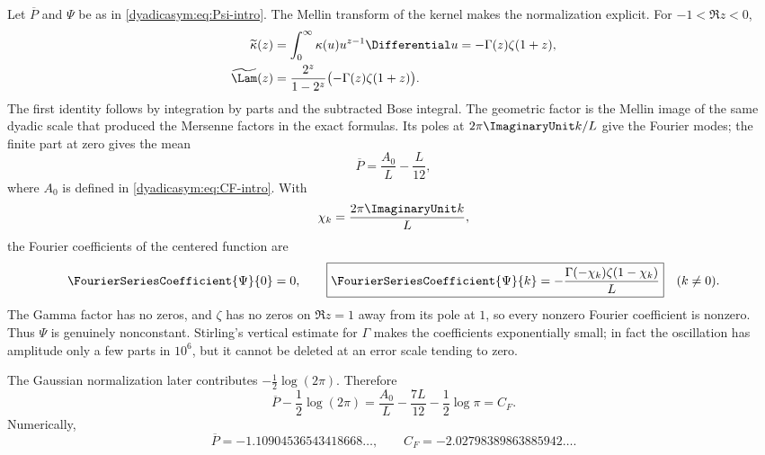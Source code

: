 \documentclass[11pt,oneside]{article}
\theoremstyle{definition}
\theoremstyle{remark}
\begin{document}
Let $\overline P$ and $\Psi$ be as in \eqref{dyadicasym:eq:Psi-intro}.  The Mellin transform of the
kernel makes the normalization explicit.  For $-1<\Re z<0$,
\begin{align}
 \widetilde\kappa(z)
 &=\int_0^\infty\kappa(u)u^{z-1}\Differential u
   =-\Gamma(z)\zeta(1+z),
 \label{dyadicasym:eq:kappa-mellin}\\
 \widetilde\Lam(z)
 &=\frac{2^z}{1-2^z}\bigl(-\Gamma(z)\zeta(1+z)\bigr).
 \label{dyadicasym:eq:Lambda-mellin}
\end{align}
The first identity follows by integration by parts and the subtracted Bose integral.  The
geometric factor is the Mellin image of the same dyadic scale that produced the Mersenne
factors in the exact formulas.  Its poles at $2\pi\ImaginaryUnit k/L$ give the Fourier modes; the
finite part at zero gives the mean
\begin{equation}
 \overline P=\frac{A_0}{L}-\frac L{12},                     \label{dyadicasym:eq:P-mean}
\end{equation}
where $A_0$ is defined in \eqref{dyadicasym:eq:CF-intro}.  With
\begin{equation}
 \chi_k=\frac{2\pi\ImaginaryUnit k}{L},                                \label{dyadicasym:eq:chi}
\end{equation}
the Fourier coefficients of the centered function are
\begin{equation}
 \FourierSeriesCoefficient{\Psi}{0}=0,
 \qquad
 \boxed{
 \FourierSeriesCoefficient{\Psi}{k}=-\frac{\Gamma(-\chi_k)\zeta(1-\chi_k)}L}
 \quad(k\ne0).                                             \label{dyadicasym:eq:Psi-Fourier-report}
\end{equation}
The Gamma factor has no zeros, and $\zeta$ has no zeros on $\Re z=1$ away from its pole at
$1$, so every nonzero Fourier coefficient is nonzero.  Thus $\Psi$ is genuinely nonconstant.
Stirling's vertical estimate for $\Gamma$ makes the coefficients exponentially small; in
fact the oscillation has amplitude only a few parts in $10^6$, but it cannot be deleted at an
error scale tending to zero.

The Gaussian normalization later contributes $-\tfrac12\log(2\pi)$.  Therefore
\begin{equation}
 \overline P-\frac12\log(2\pi)
 =\frac{A_0}{L}-\frac{7L}{12}-\frac12\log\pi
 =C_F.                                                       \label{dyadicasym:eq:CF-from-P}
\end{equation}
Numerically,
\begin{equation}
 \overline P=-1.10904536543418668\ldots,
 \qquad
 C_F=-2.02798389863885942\ldots.                            \label{dyadicasym:eq:constants-numeric}
\end{equation}
\end{document}
